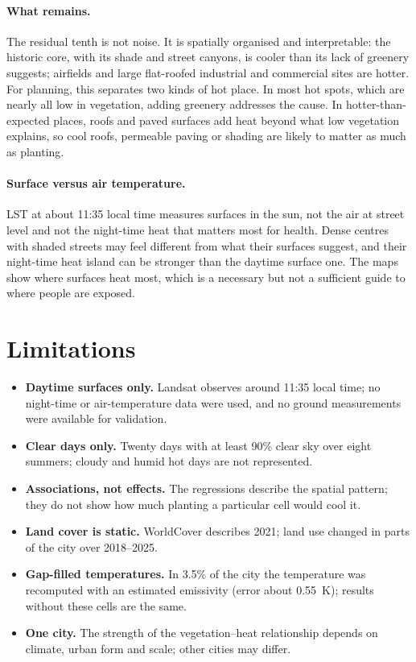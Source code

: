 \documentclass[11pt,a4paper]{article}
\begin{document}
\paragraph{What remains.} The residual tenth is not noise. It is spatially organised and interpretable: the historic core, with its shade and street canyons, is cooler than its lack of greenery suggests; airfields and large flat-roofed industrial and commercial sites are hotter. For planning, this separates two kinds of hot place. In most hot spots, which are nearly all low in vegetation, adding greenery addresses the cause. In hotter-than-expected places, roofs and paved surfaces add heat beyond what low vegetation explains, so cool roofs, permeable paving or shading are likely to matter as much as planting.

\paragraph{Surface versus air temperature.} LST at about 11:35 local time measures surfaces in the sun, not the air at street level and not the night-time heat that matters most for health. Dense centres with shaded streets may feel different from what their surfaces suggest, and their night-time heat island can be stronger than the daytime surface one. The maps show where surfaces heat most, which is a necessary but not a sufficient guide to where people are exposed.

\section{Limitations}

\begin{itemize}[leftmargin=1.2em]
  \item \textbf{Daytime surfaces only.} Landsat observes around 11:35 local time; no night-time or air-temperature data were used, and no ground measurements were available for validation.
  \item \textbf{Clear days only.} Twenty days with at least 90\% clear sky over eight summers; cloudy and humid hot days are not represented.
  \item \textbf{Associations, not effects.} The regressions describe the spatial pattern; they do not show how much planting a particular cell would cool it.
  \item \textbf{Land cover is static.} WorldCover describes 2021; land use changed in parts of the city over 2018--2025.
  \item \textbf{Gap-filled temperatures.} In 3.5\% of the city the temperature was recomputed with an estimated emissivity (error about 0.55~K); results without these cells are the same.
  \item \textbf{One city.} The strength of the vegetation–heat relationship depends on climate, urban form and scale; other cities may differ.
\end{itemize}
\end{document}
